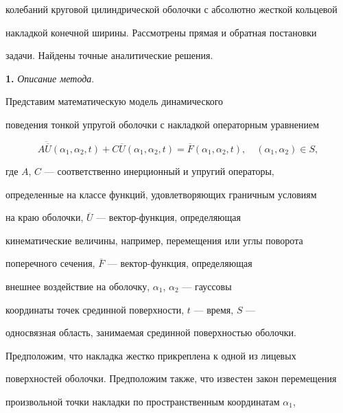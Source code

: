 колебаний круговой цилиндрической оболочки с абсолютно жесткой кольцевой


накладкой конечной ширины. Рассмотрены прямая и обратная постановки


задачи. Найдены точные аналитические решения.


\medskip








{\bf 1.} {\it Описание метода}.


Представим математическую модель динамического


поведения тонкой упругой оболочки с накладкой операторным уравнением


\begin{equation}


A\ddot{\overline U}(\alpha_{1},\alpha_{2},t)+


C\overline U(\alpha_{1},\alpha_{2},t)=


\overline F(\alpha_{1},\alpha_{2},t),


\quad (\alpha_{1},\alpha_{2})\in S,


\tag{1.1}


\end{equation}


где $A$, $C$ --- соответственно инерционный и упругий операторы,


определенные на классе функций, удовлетворяющих граничным условиям


на краю оболочки, $\overline U$ --- вектор-функция, определяющая


кинематические величины, например, перемещения или углы поворота


поперечного сечения, $\overline F$ --- вектор-функция, определяющая


внешнее воздействие на оболочку, $\alpha_{1}$, $\alpha_{2}$ --- гауссовы


координаты точек срединной поверхности, $t$ --- время, $S$ ---


односвязная область, занимаемая срединной поверхностью оболочки.








Предположим, что накладка жестко прикреплена к одной из лицевых


поверхностей оболочки. Предположим также, что известен закон перемещения


произвольной точки накладки по пространственным координатам $\alpha_{1}$,


